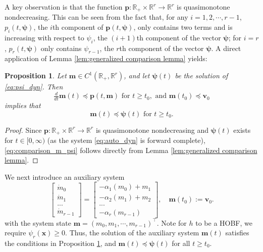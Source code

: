 \documentclass[letterpaper, 10 pt, journal, twoside]{IEEEtran}
\theoremstyle{plain}
\newtheorem{proposition}{Proposition}
\newcommand{\myvar}[1]{\bm{#1}}
\begin{document}
  A key observation is that the function $ \myvar{p}:\mathbb{R}_{+} \times \mathbb{R}^{r} \to \mathbb{R}^{r}  $ is quasimonotone nondecreasing. This can be {seen} from the fact that, for any $i = 1,2,\cdots, r-1$,  $p_i(t,\myvar{\psi})$, the $i$th component of $\myvar{p}(t,\myvar{\psi})$,  only contains two terms and is increasing with respect to $\psi_i$, the $(i+1)$th component of the vector $\myvar{\psi}$; for $i = r$, $p_r(t,\myvar{\psi}) $ only contains $\psi_{r-1}$, the $r$th component of the vector $\myvar{\psi}$.    A direct application of Lemma \ref{lem:generalized comparison lemma} yields:
  
 \begin{proposition} \label{prop:lower_bounded_system}
 	Let $ \myvar{m} \in C^{1}(\mathbb{R}_{+}, \mathbb{R}^r) $, {and let} $ \myvar{\psi}(t) $ be the solution of \eqref{eq:psi_dyn}. Then  
 	\begin{equation}
 	\tfrac{d}{dt} \myvar{m}(t) \preceq \myvar{p}(t,\myvar{m}) \text{  for  } t\ge t_0, \text{  and  } \myvar{m}(t_0)\preceq \myvar{v}_0
 	\end{equation}
 	implies that
 	\begin{equation}\label{eq:comparison_m_psi}
 	\myvar{m}(t) \preceq \myvar{\psi}(t)  \text{  for  } t\ge t_0.
 	\end{equation}
  
 \end{proposition} 
 \begin{proof}
  Since $\myvar{p}:\mathbb{R}_{+} \times \mathbb{R}^{r} \to \mathbb{R}^{r} $ is quasimonotone nondecreasing and $ \myvar{\psi}(t) $ exists for $ t\in  [0,\infty) $ (as the system \eqref{eq:auto_dyn} is forward complete),  \eqref{eq:comparison_m_psi} follows directly from Lemma \ref{lem:generalized comparison lemma}.
 \end{proof}
  
  We next introduce an auxiliary system 
 \begin{equation}\label{eq:auxiliary_sys}
 \begin{bmatrix}
 \dot{m}_0\\
 \dot{m}_1 \\
 ...\\
 \dot{m}_{r-1}
 \end{bmatrix} = \begin{bmatrix}
 -\alpha_1 (m_0) + m_1\\
 -\alpha_2 (m_1) + m_2 \\
 ...\\
 -\alpha_r (m_{r-1})
 \end{bmatrix}, \quad \myvar{m}(t_0) := \myvar{v}_0.
 \end{equation}
 with the system state $ \myvar{m} = (m_0, m_1, \cdots, m_{r-1})^\top$. Note for $ h $ to be a HOBF, we require $ \psi_r( \myvar{x}) \ge 0$. Thus, the solution of the auxiliary system $\myvar{m}(t)$ satisfies the conditions in Proposition \ref{prop:lower_bounded_system}, and $\myvar{m}(t) \preceq \myvar{\psi}(t)$ for all $t\ge t_0$.
 
\end{document}
